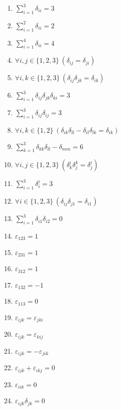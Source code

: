 \documentclass[11pt,a4paper]{article}
\begin{document}
\begin{enumerate}
\item $\displaystyle \sum_{i=1}^{3} \delta_{ii} = 3$
\item $\displaystyle \sum_{i=1}^{2} \delta_{ii} = 2$
\item $\displaystyle \sum_{i=1}^{4} \delta_{ii} = 4$
\item $\displaystyle \forall i, j \in \{1, 2, 3\}\ \left( \delta_{ij} = \delta_{ji} \right)$
\item $\displaystyle \forall i, k \in \{1, 2, 3\}\ \left( \delta_{ij}\delta_{jk} = \delta_{ik} \right)$
\item $\displaystyle \sum_{i=1}^{3} \delta_{ij}\delta_{jk}\delta_{ki} = 3$
\item $\displaystyle \sum_{i=1}^{3} \delta_{ij}\delta_{ij} = 3$
\item $\displaystyle \forall i, k \in \{1, 2\}\ \left( \delta_{ik}\delta_{ll} - \delta_{il}\delta_{lk} = \delta_{ik} \right)$
\item $\displaystyle \sum_{k=1}^{3} \delta_{kk}\delta_{ll} - \delta_{mm} = 6$
\item $\displaystyle \forall i, j \in \{1, 2, 3\}\ \left( \delta^{i}_{k}\delta^{k}_{j} = \delta^{i}_{j} \right)$
\item $\displaystyle \sum_{i=1}^{3} \delta^{i}_{i} = 3$
\item $\displaystyle \forall i \in \{1, 2, 3\}\ \left( \delta_{ij}\delta_{j1} = \delta_{i1} \right)$
\item $\displaystyle \sum_{i=1}^{3} \delta_{i1}\delta_{i2} = 0$
\item $\displaystyle \varepsilon_{123} = 1$
\item $\displaystyle \varepsilon_{231} = 1$
\item $\displaystyle \varepsilon_{312} = 1$
\item $\displaystyle \varepsilon_{132} = -1$
\item $\displaystyle \varepsilon_{113} = 0$
\item $\displaystyle \varepsilon_{ijk} = \varepsilon_{jki}$
\item $\displaystyle \varepsilon_{ijk} = \varepsilon_{kij}$
\item $\displaystyle \varepsilon_{ijk} = -\varepsilon_{jik}$
\item $\displaystyle \varepsilon_{ijk} + \varepsilon_{ikj} = 0$
\item $\displaystyle \varepsilon_{iik} = 0$
\item $\displaystyle \varepsilon_{ijk}\delta_{jk} = 0$

\end{enumerate}
\end{document}
